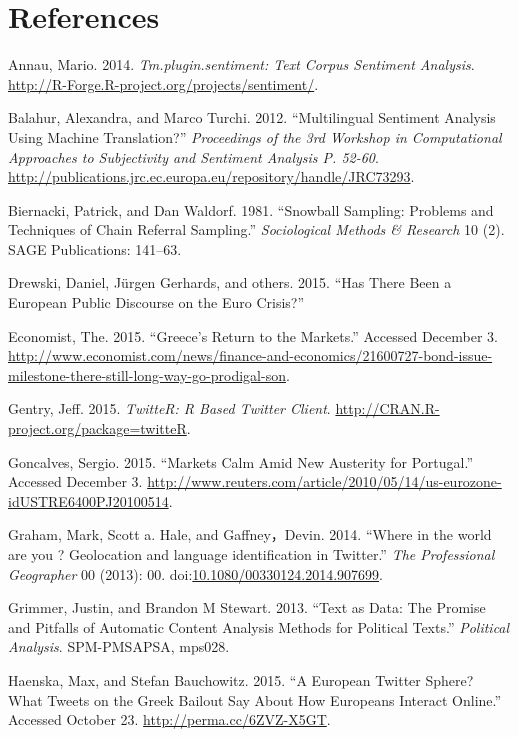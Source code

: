 \documentclass[]{article}
\begin{document}
\section*{References}\label{references}

Annau, Mario. 2014. \emph{Tm.plugin.sentiment: Text Corpus Sentiment
Analysis}. \url{http://R-Forge.R-project.org/projects/sentiment/}.

Balahur, Alexandra, and Marco Turchi. 2012. ``Multilingual Sentiment
Analysis Using Machine Translation?'' \emph{Proceedings of the 3rd
Workshop in Computational Approaches to Subjectivity and Sentiment
Analysis P. 52-60}.
\url{http://publications.jrc.ec.europa.eu/repository/handle/JRC73293}.

Biernacki, Patrick, and Dan Waldorf. 1981. ``Snowball Sampling: Problems
and Techniques of Chain Referral Sampling.'' \emph{Sociological Methods
\& Research} 10 (2). SAGE Publications: 141--63.

Drewski, Daniel, J{ü}rgen Gerhards, and others. 2015. ``Has There Been a
European Public Discourse on the Euro Crisis?''

Economist, The. 2015. ``Greece's Return to the Markets.'' Accessed
December 3.
\url{http://www.economist.com/news/finance-and-economics/21600727-bond-issue-milestone-there-still-long-way-go-prodigal-son}.

Gentry, Jeff. 2015. \emph{TwitteR: R Based Twitter Client}.
\url{http://CRAN.R-project.org/package=twitteR}.

Goncalves, Sergio. 2015. ``Markets Calm Amid New Austerity for
Portugal.'' Accessed December 3.
\url{http://www.reuters.com/article/2010/05/14/us-eurozone-idUSTRE6400PJ20100514}.

Graham, Mark, Scott a. Hale, and Gaffney，Devin. 2014. ``Where in the
world are you ? Geolocation and language identification in Twitter.''
\emph{The Professional Geographer} 00 (2013): 00.
doi:\href{http://dx.doi.org/10.1080/00330124.2014.907699}{10.1080/00330124.2014.907699}.

Grimmer, Justin, and Brandon M Stewart. 2013. ``Text as Data: The
Promise and Pitfalls of Automatic Content Analysis Methods for Political
Texts.'' \emph{Political Analysis}. SPM-PMSAPSA, mps028.

Haenska, Max, and Stefan Bauchowitz. 2015. ``A European Twitter Sphere?
What Tweets on the Greek Bailout Say About How Europeans Interact
Online.'' Accessed October 23. \url{http://perma.cc/6ZVZ-X5GT}.
\end{document}
